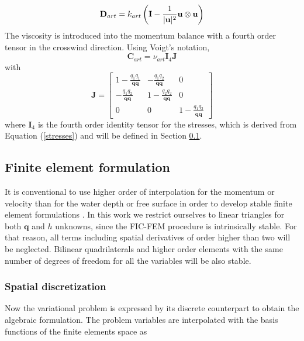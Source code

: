 \begin{equation}
\mathbf{D}_{art} = k_{art}
\left( \mathbf{I} - \frac{1}{\lvert\mathbf{u}\rvert^2} \mathbf{u} \otimes \mathbf{u} \right)
\end{equation}
The viscosity is introduced into the momentum balance with a fourth order tensor in the crosswind direction. Using Voigt's notation,
\begin{equation}
\mathbf{C}_{art} = \nu_{art} \mathbf{I}_4 \mathbf{J}
\end{equation}
with
\begin{equation}
\mathbf{J} = \left[\begin{matrix}
    1-\frac{q_1q_1}{\mathbf{q}\mathbf{q}} & -\frac{q_1q_2}{\mathbf{q}\mathbf{q}} & 0 \\
    -\frac{q_1q_2}{\mathbf{q}\mathbf{q}} & 1-\frac{q_2q_2}{\mathbf{q}\mathbf{q}} & 0 \\
    0 & 0 & 1-\frac{q_1q_2}{\mathbf{q}\mathbf{q}}
\end{matrix}\right]
\end{equation}
where $\mathbf{I}_4$ is the fourth order identity tensor for the stresses, which is derived from Equation (\ref{stresses}) and will be defined in Section \ref{sec:fic_fem}.




\subsection{Finite element formulation}
\label{sec:fic_fem} 

It is conventional to use higher order of interpolation for the momentum or velocity than for the water depth or free surface in order to develop stable finite element formulations \cite{hood1974,heniche2000,bercovier1979}. In this work we restrict ourselves to linear triangles for both $\mathbf{q}$ and $h$ unknowns, since the FIC-FEM procedure is intrinsically stable. For that reason, all terms including spatial derivatives of order higher than two will be neglected. Bilinear quadrilaterals and higher order elements with the same number of degrees of freedom for all the variables will be also stable.


\subsubsection{Spatial discretization}

Now the variational problem is expressed by its discrete counterpart to obtain the algebraic formulation. The problem variables are interpolated with the basis functions of the finite elements space as

